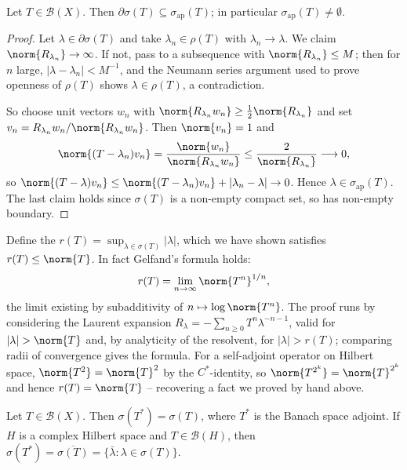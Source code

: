 \documentclass[a4paper]{scrartcl}
\newcommand{\Bop}{\mathcal{B}}
\begin{document}
\begin{proposition}
	Let $T \in \Bop(X)$. Then $\partial\sigma(T)\subseteq\sigma_{\mathrm{ap}}(T)$; in particular $\sigma_{\mathrm{ap}}(T)\neq\emptyset$.
\end{proposition}

\begin{proof}
	Let $\lambda\in\partial\sigma(T)$ and take $\lambda_n \in\rho(T)$ with $\lambda_n\to\lambda$. We claim $\norm{R_{\lambda_n}}\to\infty$. If not, pass to a subsequence with $\norm{R_{\lambda_n}}\leq M$; then for $n$ large, $|\lambda-\lambda_n|<M^{-1}$, and the Neumann series argument used to prove openness of $\rho(T)$ shows $\lambda\in\rho(T)$, a contradiction.

	So choose unit vectors $w_n$ with $\norm{R_{\lambda_n}w_n}\geq\frac12\norm{R_{\lambda_n}}$ and set $v_n = R_{\lambda_n}w_n/\norm{R_{\lambda_n}w_n}$. Then $\norm{v_n}=1$ and
	$$\norm{(T-\lambda_n)v_n} = \frac{\norm{w_n}}{\norm{R_{\lambda_n}w_n}}\leq\frac{2}{\norm{R_{\lambda_n}}}\longrightarrow0,$$
	so $\norm{(T-\lambda)v_n}\leq\norm{(T-\lambda_n)v_n}+|\lambda_n-\lambda|\to0$. Hence $\lambda\in\sigma_{\mathrm{ap}}(T)$. The last claim holds since $\sigma(T)$ is a non-empty compact set, so has non-empty boundary.
\end{proof}

\begin{remark}
	Define the  $r(T) = \sup_{\lambda\in\sigma(T)}|\lambda|$, which we have shown satisfies $r(T)\leq\norm{T}$. In fact Gelfand's formula holds:
	$$r(T) = \lim_{n\to\infty}\norm{T^n}^{1/n},$$
	the limit existing by subadditivity of $n \mapsto \log\norm{T^n}$. The proof runs by considering the Laurent expansion $R_\lambda = -\sum_{n\geq0}T^n\lambda^{-n-1}$, valid for $|\lambda|>\norm{T}$ and, by analyticity of the resolvent, for $|\lambda|>r(T)$; comparing radii of convergence gives the formula. For a self-adjoint operator on Hilbert space, $\norm{T^2}=\norm{T}^2$ by the $C^*$-identity, so $\norm{T^{2^k}}=\norm{T}^{2^k}$ and hence $r(T)=\norm{T}$ -- recovering a fact we proved by hand above.
\end{remark}

\begin{proposition}
	Let $T\in\Bop(X)$. Then $\sigma(T^*) = \sigma(T)$, where $T^*$ is the Banach space adjoint. If $H$ is a complex Hilbert space and $T\in\Bop(H)$, then $\sigma(T^*) = \overline{\sigma(T)}=\{\bar\lambda : \lambda\in\sigma(T)\}$.
\end{proposition}
\end{document}
